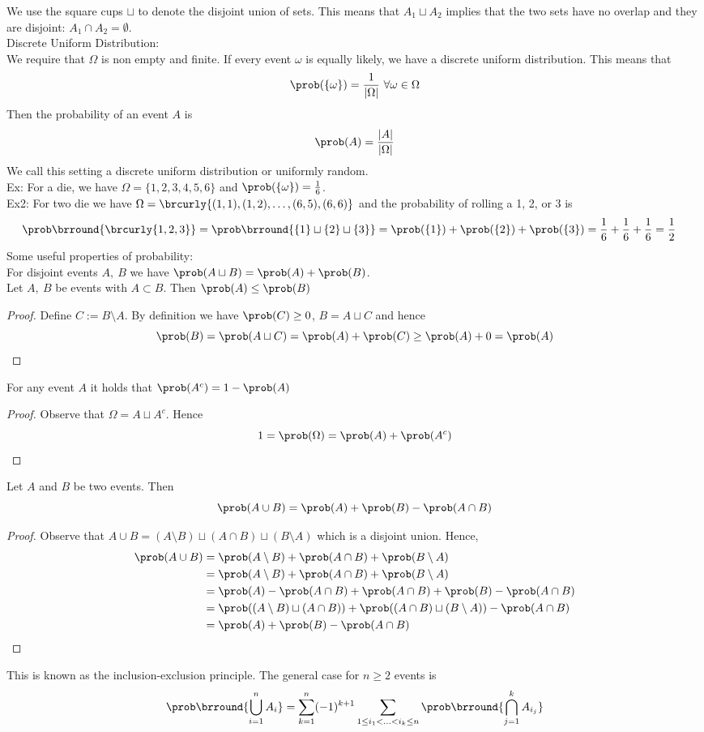 We use the square cups $\sqcup$ to denote the disjoint union of sets. This means that $A_1\sqcup A_2$ implies that the two sets have no overlap and they are disjoint: $A_1\cap A_2=\emptyset$.\\
Discrete Uniform Distribution:\\
We require that $\Omega$ is non empty and finite. If every event $\omega$ is equally likely, we have a discrete uniform distribution. This means that
\[\prob(\{\omega\})=\frac{1}{|\Omega|}\ \forall\omega\in\Omega\]
Then the probability of an event $A$ is
\[\prob(A)=\frac{|A|}{|\Omega|}\]
We call this setting a discrete uniform distribution or uniformly random.\\
Ex: For a die, we have $\Omega=\{1,2,3,4,5,6\}$ and $\prob(\{\omega\})=\frac{1}{6}$.\\
Ex2: For two die we have $\Omega=\brcurly{(1,1),(1,2),\ldots,(6,5),(6,6)}$ and the probability of rolling a 1, 2, or 3 is
\begin{align*}
    &\prob\brround{\brcurly{1,2,3}}=\prob\brround{\{1\}\sqcup\{2\}\sqcup\{3\}}=\prob(\{1\})+\prob(\{2\})+\prob(\{3\})=\frac{1}{6}+\frac{1}{6}+\frac{1}{6}=\frac{1}{2}
\end{align*}
Some useful properties of probability:\\
For disjoint events $A,\ B$ we have $\prob(A\sqcup B)=\prob(A)+\prob(B)$.\\
Let $A,\ B$ be events with $A\subset B$. Then $\prob(A)\leq\prob(B)$
\begin{proof}
Define $C:=B\setminus A$. By definition we have $\prob(C)\geq 0$, $B=A\sqcup C$ and hence
\[\prob(B)=\prob(A\sqcup C)=\prob(A)+\prob(C)\geq\prob(A)+0=\prob(A)\]
\end{proof}
For any event $A$ it holds that $\prob(A^c)=1-\prob(A)$
\begin{proof}
Observe that $\Omega=A\sqcup A^c$. Hence
\[1=\prob(\Omega)=\prob(A)+\prob(A^c)\]
\end{proof}
Let $A$ and $B$ be two events. Then
\[\prob(A\cup B)=\prob(A)+\prob(B)-\prob(A\cap B)\]
\begin{proof}
Observe that $A\cup B=(A\setminus B)\sqcup(A\cap B)\sqcup(B\setminus A)$ which is a disjoint union. Hence,
\begin{align*}
    \prob(A\cup B)&=\prob(A\setminus B)+\prob(A\cap B)+\prob(B\setminus A)\\
    &=\prob(A\setminus B)+\prob(A\cap B)+\prob(B\setminus A)\\
    &=\prob(A)-\prob(A\cap B)+\prob(A\cap B)+\prob(B)-\prob(A\cap B)\\
    &=\prob((A\setminus B)\sqcup(A\cap B))+\prob((A\cap B)\sqcup(B\setminus A))-\prob(A\cap B)\\
    &=\prob(A)+\prob(B)-\prob(A\cap B)
\end{align*}
\end{proof}
This is known as the inclusion-exclusion principle. The general case for $n\geq 2$ events is
$$\prob\brround{\bigcup_{i=1}^nA_i}=\sum_{k=1}^n(-1)^{k+1}\sum_{1\leq i_1<\ldots<i_k\leq n}\prob\brround{\bigcap_{j=1}^kA_{i_j}}$$

